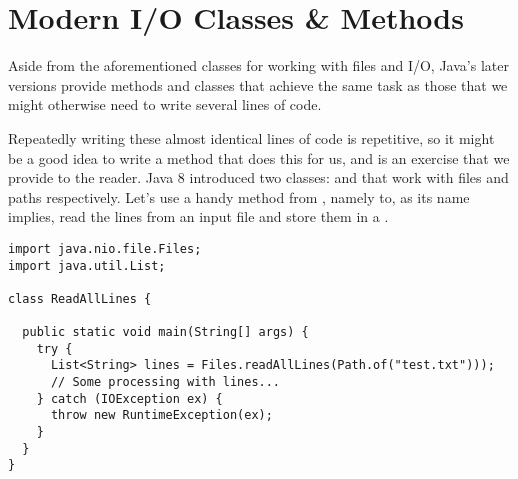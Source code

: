 


\section{Modern I/O Classes \& Methods}
Aside from the aforementioned classes for working with files and I/O, Java's later versions provide methods and classes that achieve the same task as those that we might otherwise need to write several lines of code. 

Repeatedly writing these almost identical lines of code is repetitive, so it might be a good idea to write a method that does this for us, and is an exercise that we provide to the reader. 
Java 8 introduced two classes:  and  that work with files and paths respectively. 
Let's use a handy method from , namely  to, as its name implies, read the lines from an input file and store them in a .

\begin{lstlisting}[language=MyJava]
import java.nio.file.Files;
import java.util.List;

class ReadAllLines {

  public static void main(String[] args) {
    try {
      List<String> lines = Files.readAllLines(Path.of("test.txt")));
      // Some processing with lines...
    } catch (IOException ex) {
      throw new RuntimeException(ex);
    }
  }
}
\end{lstlisting}

